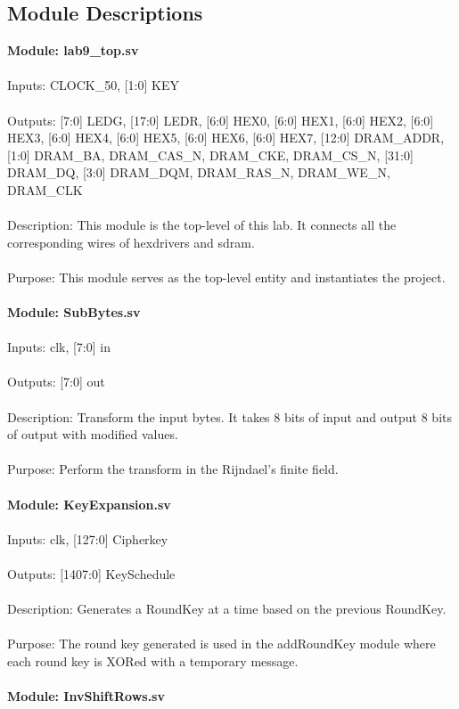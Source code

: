 \documentclass[11pt]{article}
\begin{document}
\subsection{Module Descriptions}
\textbf{Module: lab9\_top.sv}\\
\\
Inputs: CLOCK\_50, [1:0] KEY\\
\\
Outputs: [7:0] LEDG, [17:0] LEDR, [6:0] HEX0, [6:0] HEX1, [6:0] HEX2, [6:0] HEX3, [6:0] HEX4, [6:0] HEX5, [6:0] HEX6, [6:0] HEX7, [12:0] DRAM\_ADDR, [1:0] DRAM\_BA, DRAM\_CAS\_N, DRAM\_CKE, DRAM\_CS\_N, [31:0] DRAM\_DQ, [3:0] DRAM\_DQM, DRAM\_RAS\_N, DRAM\_WE\_N, DRAM\_CLK
\\
\\
Description: This module is the top-level of this lab. It connects all the corresponding wires of hexdrivers and sdram. 
\\ \\
Purpose: This module serves as the top-level entity and instantiates the project.
\\
\\
\textbf{Module: SubBytes.sv}\\
\\
Inputs: clk, [7:0] in
\\
\\
Outputs: [7:0] out
\\
\\
Description: Transform the input bytes. It takes 8 bits of input and output 8 bits of output with modified values.
\\ \\
Purpose: Perform the transform in the Rijndael’s finite field.
\\
\\
\textbf{Module: KeyExpansion.sv}\\
\\
Inputs: clk, [127:0] Cipherkey\\
\\
Outputs: [1407:0] KeySchedule
\\
\\
Description: Generates a RoundKey at a time based on the previous 
RoundKey.
\\ \\
Purpose: The round key generated is used in the addRoundKey module where each round key is XORed with a temporary message.
\\
\\
\textbf{Module: InvShiftRows.sv}\\
\end{document}
